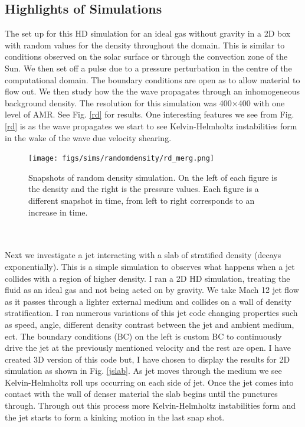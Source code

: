 \documentclass[12pt,a4paper,twoside]{article}
\begin{document}
\subsection{Highlights of Simulations}
The set up for this HD simulation for an ideal gas without gravity in a 2D box with random values for the density throughout the domain. This is similar to conditions observed on the solar surface or through the convection zone of the Sun. We then set off a pulse due to a pressure perturbation in the centre of the computational domain. The boundary conditions are open as to allow material to flow out. We then study how the the wave propagates through an inhomogeneous background density. The resolution for this simulation was 400$\times$400 with one level of AMR. See Fig. \eqref{rd} for results. One interesting features we see from Fig. \eqref{rd} is as the wave propagates we start to see Kelvin-Helmholtz instabilities form in the wake of the wave due velocity shearing.
\begin{figure}[h]
 \centering
 \texttt{[image: figs/sims/randomdensity/rd\_merg.png]}
 \caption{Snapshots of random density simulation. On the left of each figure is the density and the right is the pressure values. Each figure is a different snapshot in time, from left to right corresponds to an increase in time.}
 \label{rd}
\end{figure} \\ \\
Next we investigate a jet interacting with a slab of stratified density (decays exponentially). This is a simple simulation to observes what happens when a jet collides with a region of higher density. I ran a 2D HD simulation, treating the fluid as an ideal gas and not being acted on by gravity. We take Mach 12 jet flow as it passes through a lighter external medium and collides on a wall of density stratification. I ran numerous variations of this jet code changing properties such as speed, angle, different density contrast between the jet and ambient medium, ect. The boundary conditions (BC) on the left is custom BC to continuously drive the jet at the previously mentioned velocity and the rest are open. I have created 3D version of this code but, I have chosen to display the results for 2D simulation as shown in Fig. \eqref{jslab}. As jet moves through the medium we see Kelvin-Helmholtz roll ups occurring on each side of jet. Once the jet comes into contact with the wall of denser material the slab begins until the punctures through. Through out this process more Kelvin-Helmholtz instabilities form and the jet starts to form a kinking motion in the last snap shot. \\    
\end{document}
